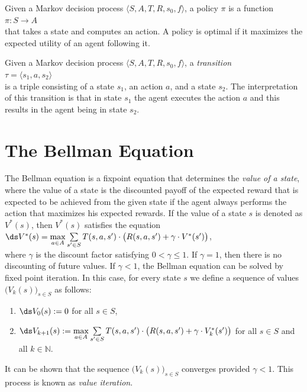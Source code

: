 \begin{Definition}[Policy]
  Given a Markov decision process $\langle S, A, T, R, s_0, f \rangle$, a policy $\pi$ is a function
  \\[0.2cm]
  \hspace*{1.3cm}
  $\pi: S \rightarrow A$
  \\[0.2cm]
  that takes a state and computes an action.  A policy is optimal if it maximizes the expected
  utility of an agent following it.
\end{Definition}

\begin{Definition}[Transition]
  Given a Markov decision process $\langle S, A, T, R, s_0, f \rangle$, a \emph{transition} 
  \\[0.2cm]
  \hspace*{1.3cm}
  $\tau = \langle s_1, a, s_2 \rangle$ 
  \\[0.2cm]
  is a triple consisting of a state $s_1$, an action $a$, and a state $s_2$.  The interpretation of
  this transition is that in state $s_1$ the agent executes the action $a$ and this results in the
  agent being in state $s_2$. \eox
\end{Definition}

\section{The Bellman Equation}
The Bellman equation is a fixpoint equation that determines the \emph{value of a state}, where the
value of a state is the discounted payoff of the expected reward that is expected to be achieved
from the given state if the agent always performs the action that maximizes his expected rewards.
If the value of a state $s$ is denoted as $V^*(s)$, then $V^*(s)$ satisfies the equation
\\[0.2cm]
\hspace*{1.3cm}
$\ds V^*(s) = \max\limits_{a \in A} \sum\limits_{s' \in S} T(s,a,s') \cdot \bigl(R(s,a,s') + \gamma \cdot V^*(s')\bigr)$,
\\[0.2cm]
where $\gamma$ is the discount factor satisfying $0 < \gamma \leq 1$.  If $\gamma = 1$, then there
is no discounting of future values.  If $\gamma < 1$, the Bellman equation can be solved by fixed
point iteration.  In this case, for every state $s$ we define a sequence of values
$\bigl(V_k(s)\bigr)_{s\in S}$ as follows:
\begin{enumerate}
\item $\ds V_0(s) := 0$ for all $s \in S$,
\item $\ds V_{k+1}(s) := \max\limits_{a \in A} \sum\limits_{s' \in S} T(s,a,s') \cdot \bigl(R(s,a,s') + \gamma \cdot V_k^*(s')\bigr)$ 
      for all $s \in S$ and all $k \in \mathbb{N}$.
\end{enumerate}
It can be shown that the sequence $\bigl(V_k(s)\bigr)_{s\in S}$ converges provided $\gamma < 1$.
This process is known as \emph{value iteration}.


